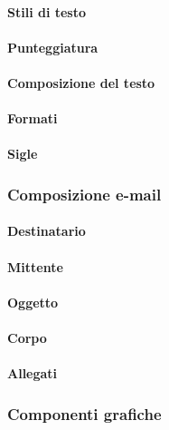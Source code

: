 \paragraph{Stili di testo}

\paragraph{Punteggiatura}

\paragraph{Composizione del testo}

\paragraph{Formati}

\paragraph{Sigle}

\subsubsection{Composizione e-mail}

\paragraph{Destinatario}

\paragraph{Mittente}

\paragraph{Oggetto}

\paragraph{Corpo}

\paragraph{Allegati}

\subsubsection{Componenti grafiche}

